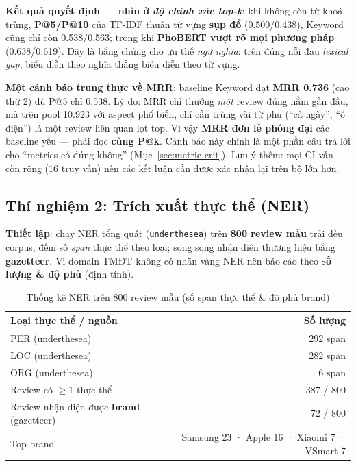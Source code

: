 \documentclass[12pt,a4paper]{article}
\begin{document}
\noindent\textbf{Kết quả quyết định --- nhìn ở \textit{độ chính xác top-k}}: khi không còn từ khoá trùng, \textbf{P@5/P@10} của TF-IDF thuần từ vựng \textbf{sụp đổ} (0.500/0.438), Keyword cũng chỉ còn 0.538/0.563; trong khi \textbf{PhoBERT vượt rõ mọi phương pháp} (0.638/0.619). Đây là bằng chứng cho ưu thế \textit{ngữ nghĩa}: trên đúng nỗi đau \textit{lexical gap}, biểu diễn theo nghĩa thắng biểu diễn theo từ vựng.

\noindent\textbf{Một cảnh báo trung thực về MRR}: baseline Keyword đạt \textbf{MRR 0.736} (cao thứ 2) dù P@5 chỉ 0.538. Lý do: MRR chỉ thưởng \textit{một} review đúng nằm gần đầu, mà trên pool 10.923 với aspect phổ biến, chỉ cần trùng vài từ phụ (``cả ngày'', ``ổ điện'') là một review liên quan lọt top. Vì vậy \textbf{MRR đơn lẻ phóng đại} các baseline yếu --- phải đọc \textbf{cùng P@k}. Cảnh báo này chính là một phần câu trả lời cho ``metrics có đúng không'' (Mục~\ref{sec:metric-crit}). Lưu ý thêm: mọi CI vẫn còn rộng (16 truy vấn) nên các kết luận cần được xác nhận lại trên bộ lớn hơn.

\subsection{Thí nghiệm 2: Trích xuất thực thể (NER)}

\textbf{Thiết lập}: chạy NER tổng quát (\texttt{underthesea}) trên \textbf{800 review mẫu} trải đều corpus, đếm số \textit{span} thực thể theo loại; song song nhận diện thương hiệu bằng \textbf{gazetteer}. Vì domain TMĐT không có nhãn vàng NER nên báo cáo theo \textbf{số lượng \& độ phủ} (định tính).

\begin{table}[H]
\centering
\caption{Thống kê NER trên 800 review mẫu (số span thực thể \& độ phủ brand)}
\begin{tabular}{lr}
\toprule
\textbf{Loại thực thể / nguồn} & \textbf{Số lượng} \\
\midrule
PER (underthesea) & 292 span \\
LOC (underthesea) & 282 span \\
ORG (underthesea) & 6 span \\
Review có $\geq 1$ thực thể & 387 / 800 \\
\midrule
Review nhận diện được \textbf{brand} (gazetteer) & 72 / 800 \\
\quad Top brand & Samsung 23 · Apple 16 · Xiaomi 7 · VSmart 7 \\
\bottomrule
\end{tabular}
\end{table}
\end{document}
